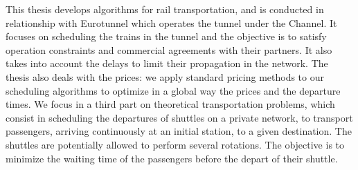 This thesis develops algorithms for rail transportation, and is conducted in relationship with Eurotunnel which operates the tunnel under the Channel.
It focuses on scheduling the trains in the tunnel and the objective is to satisfy operation constraints and commercial agreements with their partners. It also takes into account the delays to limit their propagation in the network.
The thesis also deals with the prices: we apply standard pricing methods to our scheduling algorithms to optimize in a global way the prices and the departure times. 
We focus in a third part on theoretical transportation problems, which consist in scheduling the departures of shuttles on a private network, to transport passengers, arriving continuously at an initial station, to a given destination. The shuttles are potentially allowed to perform several rotations. The objective is to minimize the waiting time of the passengers before the depart of their shuttle.